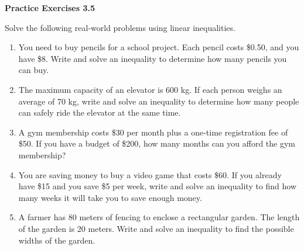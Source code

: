  \vspace{0.3ex}
\noindent\textbf{Practice Exercises 3.5}

\vspace{0.2ex}

Solve the following real-world problems using linear inequalities.
\begin{enumerate}[noitemsep, label = \color{blue}\arabic*. ]
    \item You need to buy pencils for a school project. Each pencil costs \$0.50, and you have \$8. Write and solve an inequality to determine how many pencils you can buy.
    \item The maximum capacity of an elevator is 600 kg. If each person weighs an average of 70 kg, write and solve an inequality to determine how many people can safely ride the elevator at the same time.
    \item A gym membership costs \$30 per month plus a one-time registration fee of \$50. If you have a budget of \$200, how many months can you afford the gym membership?
    \item You are saving money to buy a video game that costs \$60. If you already have \$15 and you save \$5 per week, write and solve an inequality to find how many weeks it will take you to save enough money.
    \item A farmer has 80 meters of fencing to enclose a rectangular garden. The length of the garden is 20 meters. Write and solve an inequality to find the possible widths of the garden.
\end{enumerate}

